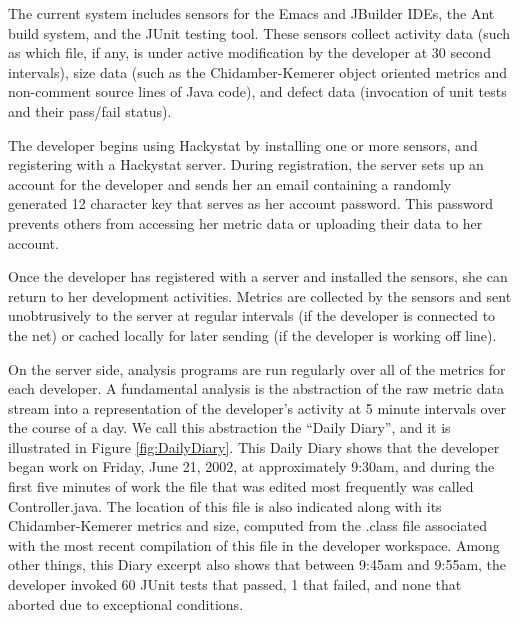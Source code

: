 \documentclass[12pt]{article}
\begin{document}
The current system includes sensors for the Emacs and JBuilder
IDEs, the Ant build system, and the JUnit testing tool.  These sensors
collect activity data (such as which file, if any, is under active
modification by the developer at 30 second intervals), size data (such as
the Chidamber-Kemerer object oriented metrics and non-comment source lines
of Java code), and defect data (invocation of unit tests and their
pass/fail status).   

The developer begins using Hackystat by installing one or more sensors, and
registering with a Hackystat server. During registration, the server sets
up an account for the developer and sends her an email containing a
randomly generated 12 character key that serves as her account password.
This password prevents others from accessing her metric data or
uploading their data to her account.

Once the developer has registered with a server and installed the sensors,
she can return to her development activities. Metrics are collected by the
sensors and sent unobtrusively to the server at regular intervals (if the
developer is connected to the net) or cached locally for later sending (if
the developer is working off line).

On the server side, analysis programs are run regularly over all of the
metrics for each developer.  A fundamental analysis is the abstraction of
the raw metric data stream into a representation of the developer's
activity at 5 minute intervals over the course of a day.  We call this
abstraction the ``Daily Diary'', and it is illustrated in Figure
\ref{fig:DailyDiary}. This Daily Diary shows that the developer began work
on Friday, June 21, 2002, at approximately 9:30am, and during the first
five minutes of work the file that was edited most frequently was called
Controller.java.  The location of this file is also indicated along with
its Chidamber-Kemerer metrics and size, computed from the .class file
associated with the most recent compilation of this file in the developer
workspace. Among other things, this Diary excerpt also shows that between
9:45am and 9:55am, the developer invoked 60 JUnit tests that passed, 1 that
failed, and none that aborted due to exceptional conditions.

\begin{figure*}[tbp]
 {\centerline {}}
 \caption{The Daily Diary: Developer metrics at five minute intervals.}
 \label{fig:DailyDiary}
\end{figure*}
\end{document}
